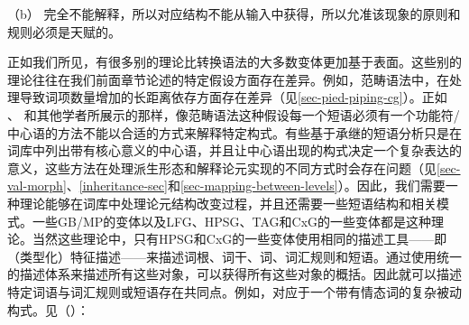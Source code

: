 \zl

（b） 完全不能解释，所以对应结构不能从输入中获得，所以允准该现象的原则和规则必须是天赋的。

正如我们所见，有很多别的理论比转换语法的大多数变体更加基于表面。这些别的理论往往在我们前面章节论述的特定假设方面存在差异。例如，范畴语法中，在处理导致词项数量增加的长距离依存方面存在差异（见\ref{sec-pied-piping-cg}）。正如 \citet{Jacobs2008a}、 \citet{Jackendoff2008a}和其他学者所展示的那样，像范畴语法这种假设每一个短语必须有一个功能符/中心语的方法不能以合适的方式来解释特定构式。有些基于承继的短语分析只是在词库中列出带有核心意义的中心语，并且让中心语出现的构式决定一个复杂表达的意义，这些方法在处理派生形态和解释论元实现的不同方式时会存在问题（见\ref{sec-val-morph}、\ref{inheritance-sec}和\ref{sec-mapping-between-levels}）。因此，我们需要一种理论能够在词库中处理论元结构改变过程，并且还需要一些短语结构和相关模式。一些GB/MP的变体以及LFG、HPSG、TAG和CxG的一些变体都是这种理论。当然这些理论中，只有HPSG和CxG的一些变体使用相同的描述工具——即（类型化）特征描述——来描述词根、词干、词、词汇规则和短语。通过使用统一的描述体系来描述所有这些对象，可以获得所有这些对象的概括。因此就可以描述特定词语与词汇规则或短语存在共同点。例如，\bard{}对应于一个带有情态词的复杂被动构式。见（）：
